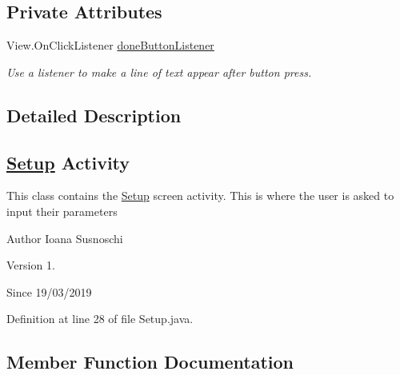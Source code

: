 \subsection*{Private Attributes}
\begin{DoxyCompactItemize}
\item 
View.\+On\+Click\+Listener \mbox{\hyperlink{classcom_1_1example_1_1trainawearapplication_1_1_setup_a6e717a2baaf80c283f516c044ae98e6c}{done\+Button\+Listener}}
\begin{DoxyCompactList}\small\item\em Use a listener to make a line of text appear after button press. \end{DoxyCompactList}\end{DoxyCompactItemize}


\subsection{Detailed Description}
\subsection*{\mbox{\hyperlink{classcom_1_1example_1_1trainawearapplication_1_1_setup}{Setup}} Activity}

This class contains the \mbox{\hyperlink{classcom_1_1example_1_1trainawearapplication_1_1_setup}{Setup}} screen activity. This is where the user is asked to input their parameters

\begin{DoxyAuthor}{Author}
Ioana Susnoschi 
\end{DoxyAuthor}
\begin{DoxyVersion}{Version}
1. 
\end{DoxyVersion}
\begin{DoxySince}{Since}
19/03/2019 
\end{DoxySince}


Definition at line 28 of file Setup.\+java.



\subsection{Member Function Documentation}
\mbox{\label{classcom_1_1example_1_1trainawearapplication_1_1_setup_a52f522c34d14c93dbf7f75ff75ce606d}} 
